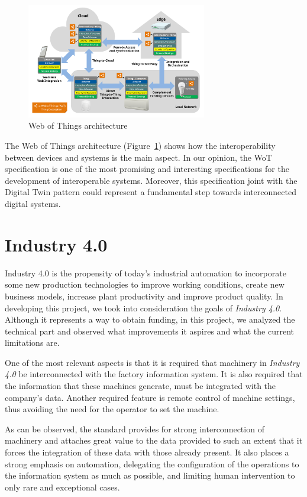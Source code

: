 \begin{figure}[h]
	\centering
	\includegraphics[width=0.7\textwidth]{img/wot.png}
	\caption{Web of Things architecture}
	\label{fig:iot}
\end{figure}

The Web of Things architecture (Figure~\ref{fig:iot}) shows how the interoperability between devices and systems is the main aspect.
In our opinion, the WoT specification is one of the most promising and interesting specifications for the development of interoperable systems.
Moreover, this specification joint with the Digital Twin pattern could represent a fundamental step towards interconnected digital systems.

\section{Industry 4.0}
Industry 4.0 is the propensity of today's industrial automation to incorporate some new production technologies to improve working conditions, create
new business models, increase plant productivity and improve product quality.
In developing this project, we took into consideration the goals of \textit{Industry 4.0}. Although it represents a way to obtain funding,
in this project, we analyzed the technical part and observed what improvements it aspires and what the current limitations are.


One of the most relevant aspects is that it is required that machinery in \textit{Industry 4.0} be interconnected with the factory information
system. It is also required that the information that these machines generate, must be integrated with the company's data.
Another required feature is remote control of machine settings, thus avoiding the need for the operator to set the machine.

As can be observed, the standard provides for strong interconnection of machinery and attaches great value to the data provided to such an extent that it forces the integration of these data with those already present. It also places a strong emphasis on automation, delegating the configuration of the operations to the information system as much as possible, and limiting human intervention to only rare and exceptional cases.

